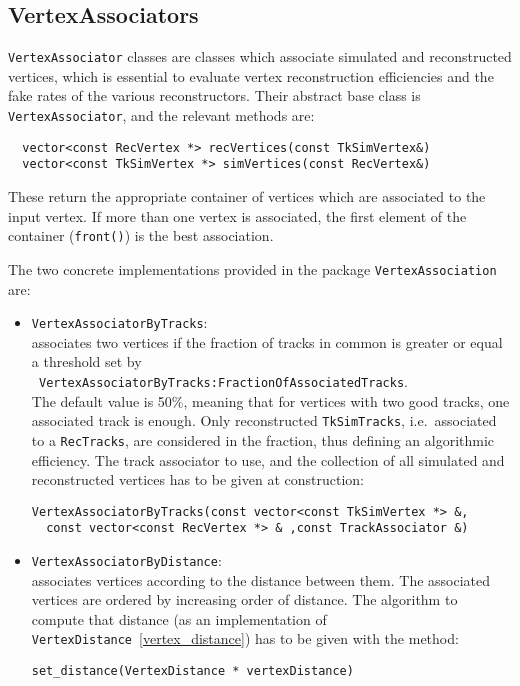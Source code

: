 \subsection{VertexAssociators}


\verb/VertexAssociator/ classes are classes which associate simulated and
 reconstructed vertices, which is essential to evaluate vertex
 reconstruction efficiencies and the fake rates of the various
 reconstructors.
Their abstract base class is \verb/VertexAssociator/, and the relevant methods are:

\begin{verbatim}
  vector<const RecVertex *> recVertices(const TkSimVertex&)
  vector<const TkSimVertex *> simVertices(const RecVertex&)
  \end{verbatim}

These return the appropriate container of vertices which are associated to
 the input vertex.
If more than one vertex is associated, the first element of the container
 ({\tt front()}) is the best association.

The two concrete implementations provided in the package 
\verb/VertexAssociation/ are:

\begin{itemize}
\item {\tt VertexAssociatorByTracks}: \\
 associates two vertices if the fraction of tracks in common is greater or
 equal a threshold set by\\ {\tt
 VertexAssociatorByTracks:FractionOfAssociatedTracks}.\\ 
 The default value is 50\%, meaning that for vertices with two good
 tracks, one associated track is enough.
 Only reconstructed {\tt TkSimTracks}, i.e.\ associated to a
  \verb/RecTracks/,  are considered in the fraction,
  thus defining an algorithmic efficiency. 
  The track associator to use, and the collection of all simulated and
 reconstructed vertices has to be given at construction:
  \begin{verbatim}
VertexAssociatorByTracks(const vector<const TkSimVertex *> &, 
  const vector<const RecVertex *> & ,const TrackAssociator &)
  \end{verbatim}

\item {\tt VertexAssociatorByDistance}: \\
associates vertices according to the distance between them.
The associated vertices are ordered by increasing order of distance. 
The algorithm to compute that distance (as an implementation of
 \verb/VertexDistance/~\ref{vertex_distance}) has to be given with the method:
\begin{verbatim}
set_distance(VertexDistance * vertexDistance)
\end{verbatim}

\end{itemize}

